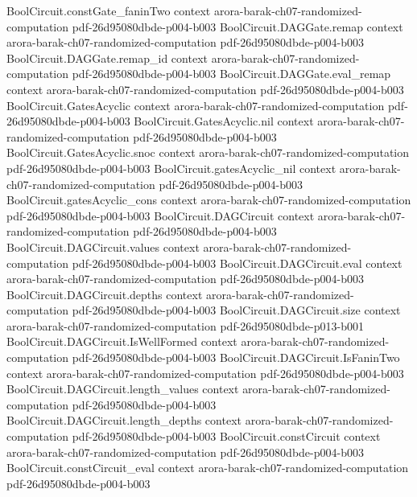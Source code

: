 \begin{theorem}
  {BoolCircuit.constGate_faninTwo}
  {context}
  {arora-barak-ch07-randomized-computation}
  {pdf-26d95080dbde-p004-b003}
\proofstep
  {BoolCircuit.DAGGate.remap}
  {context}
  {arora-barak-ch07-randomized-computation}
  {pdf-26d95080dbde-p004-b003}
\proofstep
  {BoolCircuit.DAGGate.remap_id}
  {context}
  {arora-barak-ch07-randomized-computation}
  {pdf-26d95080dbde-p004-b003}
\proofstep
  {BoolCircuit.DAGGate.eval_remap}
  {context}
  {arora-barak-ch07-randomized-computation}
  {pdf-26d95080dbde-p004-b003}
\proofstep
  {BoolCircuit.GatesAcyclic}
  {context}
  {arora-barak-ch07-randomized-computation}
  {pdf-26d95080dbde-p004-b003}
\proofstep
  {BoolCircuit.GatesAcyclic.nil}
  {context}
  {arora-barak-ch07-randomized-computation}
  {pdf-26d95080dbde-p004-b003}
\proofstep
  {BoolCircuit.GatesAcyclic.snoc}
  {context}
  {arora-barak-ch07-randomized-computation}
  {pdf-26d95080dbde-p004-b003}
\proofstep
  {BoolCircuit.gatesAcyclic_nil}
  {context}
  {arora-barak-ch07-randomized-computation}
  {pdf-26d95080dbde-p004-b003}
\proofstep
  {BoolCircuit.gatesAcyclic_cons}
  {context}
  {arora-barak-ch07-randomized-computation}
  {pdf-26d95080dbde-p004-b003}
\proofstep
  {BoolCircuit.DAGCircuit}
  {context}
  {arora-barak-ch07-randomized-computation}
  {pdf-26d95080dbde-p004-b003}
\proofstep
  {BoolCircuit.DAGCircuit.values}
  {context}
  {arora-barak-ch07-randomized-computation}
  {pdf-26d95080dbde-p004-b003}
\proofstep
  {BoolCircuit.DAGCircuit.eval}
  {context}
  {arora-barak-ch07-randomized-computation}
  {pdf-26d95080dbde-p004-b003}
\proofstep
  {BoolCircuit.DAGCircuit.depths}
  {context}
  {arora-barak-ch07-randomized-computation}
  {pdf-26d95080dbde-p004-b003}
\proofstep
  {BoolCircuit.DAGCircuit.size}
  {context}
  {arora-barak-ch07-randomized-computation}
  {pdf-26d95080dbde-p013-b001}
\proofstep
  {BoolCircuit.DAGCircuit.IsWellFormed}
  {context}
  {arora-barak-ch07-randomized-computation}
  {pdf-26d95080dbde-p004-b003}
\proofstep
  {BoolCircuit.DAGCircuit.IsFaninTwo}
  {context}
  {arora-barak-ch07-randomized-computation}
  {pdf-26d95080dbde-p004-b003}
\proofstep
  {BoolCircuit.DAGCircuit.length_values}
  {context}
  {arora-barak-ch07-randomized-computation}
  {pdf-26d95080dbde-p004-b003}
\proofstep
  {BoolCircuit.DAGCircuit.length_depths}
  {context}
  {arora-barak-ch07-randomized-computation}
  {pdf-26d95080dbde-p004-b003}
\proofstep
  {BoolCircuit.constCircuit}
  {context}
  {arora-barak-ch07-randomized-computation}
  {pdf-26d95080dbde-p004-b003}
\proofstep
  {BoolCircuit.constCircuit_eval}
  {context}
  {arora-barak-ch07-randomized-computation}
  {pdf-26d95080dbde-p004-b003}

\end{theorem}
